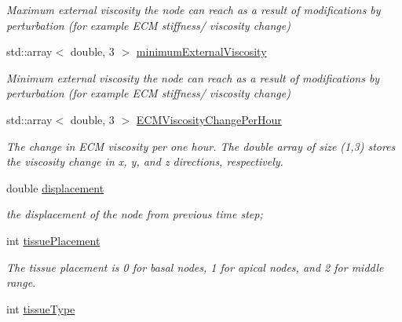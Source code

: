 \begin{DoxyCompactItemize}
\begin{DoxyCompactList}\small\item\em Maximum external viscosity the node can reach as a result of modifications by perturbation (for example E\+C\+M stiffness/ viscosity change) \end{DoxyCompactList}\item 
\hypertarget{classNode_a59528693432e71fa9b9e7ecfef6ee274}{}std\+::array$<$ double, 3 $>$ \hyperlink{classNode_a59528693432e71fa9b9e7ecfef6ee274}{minimum\+External\+Viscosity}\label{classNode_a59528693432e71fa9b9e7ecfef6ee274}

\begin{DoxyCompactList}\small\item\em Minimum external viscosity the node can reach as a result of modifications by perturbation (for example E\+C\+M stiffness/ viscosity change) \end{DoxyCompactList}\item 
\hypertarget{classNode_a58afaee3d71a2c122396265c91acda04}{}std\+::array$<$ double, 3 $>$ \hyperlink{classNode_a58afaee3d71a2c122396265c91acda04}{E\+C\+M\+Viscosity\+Change\+Per\+Hour}\label{classNode_a58afaee3d71a2c122396265c91acda04}

\begin{DoxyCompactList}\small\item\em The change in E\+C\+M viscosity per one hour. The double array of size (1,3) stores the viscosity change in x, y, and z directions, respectively. \end{DoxyCompactList}\item 
\hypertarget{classNode_a1f25afa638813548bef54299c2d756e4}{}double \hyperlink{classNode_a1f25afa638813548bef54299c2d756e4}{displacement}\label{classNode_a1f25afa638813548bef54299c2d756e4}

\begin{DoxyCompactList}\small\item\em the displacement of the node from previous time step; \end{DoxyCompactList}\item 
\hypertarget{classNode_af754322e3928dc45f70b19762551890a}{}int \hyperlink{classNode_af754322e3928dc45f70b19762551890a}{tissue\+Placement}\label{classNode_af754322e3928dc45f70b19762551890a}

\begin{DoxyCompactList}\small\item\em The tissue placement is 0 for basal nodes, 1 for apical nodes, and 2 for middle range. \end{DoxyCompactList}\item 
\hypertarget{classNode_ae621097f98f1d33d283cf65a0a02d29a}{}int \hyperlink{classNode_ae621097f98f1d33d283cf65a0a02d29a}{tissue\+Type}\label{classNode_ae621097f98f1d33d283cf65a0a02d29a}


\end{DoxyCompactItemize}
